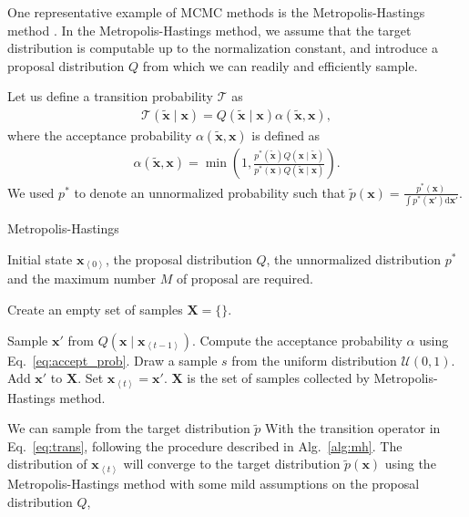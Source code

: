 \documentclass[dissertation,nocontribution]{aaltoseries}
\newcommand{\qt}[1]{\left<#1\right>}
\newcommand{\vect}[1]{\mathbf{#1}}
\newcommand{\vx}[0]{\vect{x}}
\newcommand{\T}[0]{\mathcal{T}}
\newcommand{\dd}[1]{\text{d}{#1}}
\begin{document}
One representative example of MCMC methods is
the Metropolis-Hastings method \citep{Hastings1970}. In the
Metropolis-Hastings method, we assume that the target
distribution is computable up to the normalization constant,
and introduce a proposal distribution $Q$ from which we can
readily and efficiently sample.

Let us define a transition probability $\T$ as
\begin{align}
    \label{eq:trans}
    \T(\tilde{\vx} \mid \vx) = Q(\tilde{\vx}\mid \vx)
    \alpha(\tilde{\vx}, \vx),
\end{align}
where the acceptance probability $\alpha(\tilde{\vx}, \vx)$ is
defined as
\begin{align}
    \label{eq:accept_prob}
    \alpha(\tilde{\vx}, \vx) = \min \left(1, 
    \frac{p^*(\tilde{\vx})Q(\vx \mid \tilde{\vx})}
    {p^*(\vx)Q(\tilde{\vx} \mid \vx)} \right).
\end{align}
We used $p^*$ to denote an unnormalized probability
such that
$\tilde{p}(\vx) = \tfrac{p^*(\vx)}{\int p^*(\vx') \dd{\vx'}}$.

\begin{algorithm}[tb]
    \caption[Metropolis-Hastings
    Method]{Metropolis-Hastings}
    \label{alg:mh}
    \begin{algorithmic}
        \STATE Initial state $\vx_{\qt{0}}$, the proposal
        distribution $Q$, the unnormalized distribution
        $p^*$ and the maximum number $M$ of proposal are required.

        \STATE Create an empty set of samples $\boldsymbol{X}=\{\}$.

        \STATE Sample $\vx'$ from $Q(\vx \mid
        \vx_{\qt{t-1}})$.
        \STATE Compute the acceptance probability
        $\alpha$ using Eq.~\eqref{eq:accept_prob}.
        \STATE Draw a sample $s$ from the uniform distribution
        $\mathcal{U}(0, 1)$.
        \STATE Add $\vx'$ to $\boldsymbol{X}$.
        \STATE Set $\vx_{\qt{t}} = \vx'$.
        \ENDIF
        \ENDFOR
        \STATE
        $\boldsymbol{X}$ is the set of samples collected by
        Metropolis-Hastings method.
    \end{algorithmic}
\end{algorithm}

We can sample from the target
distribution $\tilde{p}$ With the transition operator in Eq.~\eqref{eq:trans}, 
following the procedure described in Alg.~\ref{alg:mh}.
The distribution of $\vx_{\qt{t}}$ will converge to the target
distribution $\tilde{p}(\vx)$ using the Metropolis-Hastings
method
with some mild assumptions on the proposal distribution $Q$,
\end{document}
